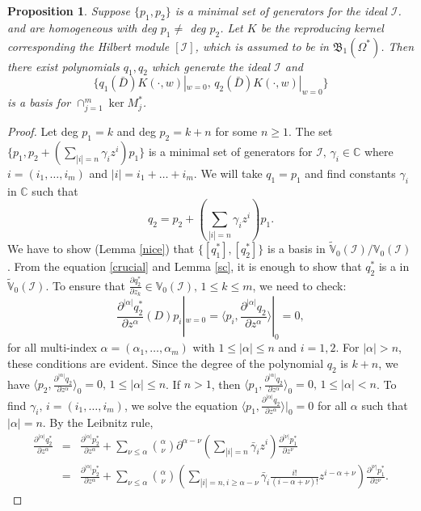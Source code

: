 \documentclass[11pt]{amsart}
\newtheorem{prop}[thm]{Proposition}
\theoremstyle{definition}
\numberwithin{equation}{section}
\begin{document}
\begin{prop}\label{gen}
Suppose $\{p_1, p_2\}$ is a minimal set of generators for the ideal
$\mathcal I$. and are homogeneous with deg $p_1\neq$ deg $p_2$. Let $K$ be the reproducing kernel corresponding the Hilbert module $[\mathcal I]$, which is assumed to be in $\mathfrak B_1(\Omega^*)$. Then there exist polynomials $q_1,q_2$ which generate
the ideal $\mathcal I$ and 
$$
\{q_1(\bar
D)K(\cdot,w)|_{w=0},\, q_2(\bar D)K(\cdot,w)|_{w=0}\}
$$ 
is a basis for $\cap_{j=1}^m\ker M_j^*$.
\end{prop}
\begin{proof}
Let deg $p_1=k$ and deg $p_2=k+n$ for some $n\geq 1$. The set $\{p_1, p_2+(\sum_{|i|=n}\gamma_iz^i)p_1\}$ is a minimal set of generators for $\mathcal I,\, {\gamma}_i\in{{\mathbb C}}$ where $i = (i_1,\ldots,i_m)$ and $|i| =
i_1+\ldots+i_m$. We will take $q_1=p_1$ and find constants ${\gamma}_i$ in ${{\mathbb C}}$ such that
$$
q_2 =p_2+ (\sum_{|i|=n}\gamma_iz^i)p_1.
$$
We have to show (Lemma \ref{nice}) that $\{[q_1^*],[q_2^*]\}$ is a basis in $\tilde{\mathbb V}_{0}(\mathcal I)/\mathbb V_0(\mathcal I)$.
From the equation \eqref{crucial} and Lemma \ref{sc}, it is enough to show that $q_2^*$ is a  in $\tilde{\mathbb V}_{0}(\mathcal I)$. To ensure that $\frac{\partial q_2^*}{\partial z_k}\in\mathbb V_0(\mathcal I),\,1\leq k\leq m$, we need to check: 
$$
\frac{\partial^{|\alpha|}q_2^*}{\partial z^{\alpha}}(D)p_i|_{w=0} = \langle p_i,  \frac{\partial^{|\alpha|}q_2}{\partial z^{\alpha}}\rangle|_0 = 0, 
$$
for all multi-index $\alpha =(\alpha_1,\ldots,\alpha_m)$  with 
$1\leq|\alpha|\leq n$ and $i=1,2$. For $|{\alpha}|>n$, these conditions are evident. Since the degree of the polynomial $q_2$ is $k+n$, we have $\langle p_2,  \frac{\partial^{|\alpha|}q_2}{\partial z^{\alpha}}\rangle_0 = 0,\,1\leq|\alpha|\leq n$. If $n>1$, then $\langle p_1,  \frac{\partial^{|\alpha|}q_2}{\partial z^{\alpha}}\rangle_0 = 0,\,1\leq|\alpha|< n$. To find $\gamma_{i},\,i = (i_1,\ldots,i_m)$, we solve the equation $\langle p_1,  \frac{\partial^{|\alpha|}q_2}{\partial z^{\alpha}}\rangle|_0 = 0$ for all $\alpha$ such that $|\alpha|=n$. By the Leibnitz rule,
\begin{eqnarray*}
\frac{\partial^{|\alpha|}q_2^*}{\partial z^{\alpha}} &=& \frac{\partial^{|\alpha|}p_2^*}{\partial z^{\alpha}}+\sum_{\nu\leq \alpha}\binom{\alpha}{\nu}\partial^{\alpha -\nu}(\sum_{|i|=n} \bar {\gamma}_iz^i)\frac{\partial^{|\nu|}p_1^*}{\partial z^{\nu}}   \\ &=& \frac{\partial^{|\alpha|}p_2^*}{\partial z^{\alpha}}+ \sum_{\nu\leq \alpha}\binom{\alpha}{\nu}(\sum_{|i|=n,i\geq \alpha - \nu} \bar {\gamma}_i\frac{i!}{(i-\alpha+\nu)!}z^{i-\alpha+\nu})\frac{\partial^{|\nu|}p_1^*}{\partial z^{\nu}} .

\end{eqnarray*}
\end{proof}
\end{document}
